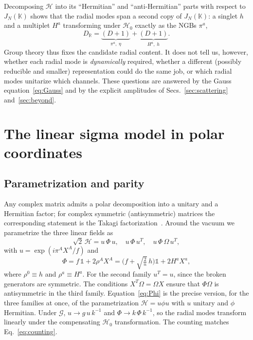 \documentclass[aps,prd,twocolumn,superscriptaddress,nofootinbib,floatfix]{revtex4-2}
\theoremstyle{remark}
\newcommand{\Hf}{\mathcal{H}}      %
\newcommand{\G}{\mathcal{G}}
\newcommand{\Hg}{\mathcal{H}_0}    %
\begin{document}
Decomposing $\Hf$ into its ``Hermitian'' and ``anti-Hermitian'' parts with respect to $J_N(\mathbb{K})$ shows that the radial modes span a second copy of $J_N(\mathbb{K})$: a singlet $h$ and a multiplet $H^a$ transforming under $\Hg$ exactly as the NGBs $\pi^a$,
\begin{equation}
D_{\mathbb R}=\underbrace{(D+1)}_{\pi^a,\;\eta}+\underbrace{(D+1)}_{H^a,\;h}.
\label{eq:counting}
\end{equation}
Group theory thus fixes the candidate radial content. It does not tell us, however, whether each radial mode is \emph{dynamically} required, whether a different (possibly reducible and smaller) representation could do the same job, or which radial modes unitarize which channels. These questions are answered by the Gauss equation~\eqref{eq:Gauss} and by the explicit amplitudes of Secs.~\ref{sec:scattering} and~\ref{sec:beyond}.

\section{The linear sigma model in polar coordinates}
\label{sec:LSM}

\subsection{Parametrization and parity}

Any complex matrix admits a polar decomposition into a unitary and a Hermitian factor; for complex symmetric (antisymmetric) matrices the corresponding statement is the Takagi factorization~\cite{Takagi:1924,HornJohnson}. Around the vacuum we parametrize the three linear fields as
\begin{equation}
\sqrt2\,\Hf=u\,\Phi\,u,\quad u\,\Phi\,u^T,\quad u\,\Phi\,\Omega\,u^T ,
\label{eq:polar}
\end{equation}
with $u=\exp(i\pi^AX^A/f)$ and
\begin{equation}
\Phi=f\,\mathbb{1}+2\rho^AX^A=\Big(f+\sqrt{\tfrac{2}{n}}\,h\Big)\mathbb{1}+2H^aX^a ,
\label{eq:Phi}
\end{equation}
where $\rho^0\equiv h$ and $\rho^a\equiv H^a$. For the second family $u^T=u$, since the broken generators are symmetric. The conditions $X^T\Omega=\Omega X$ ensure that $\Phi\Omega$ is antisymmetric in the third family. Equation~\eqref{eq:Phi} is the precise version, for the three families at once, of the parametrization $\Hf=u\phi u$ with $u$ unitary and $\phi$ Hermitian. Under $\G$, $u\to g\,u\,k^{-1}$ and $\Phi\to k\,\Phi\,k^{-1}$, so the radial modes transform linearly under the compensating $\Hg$ transformation. The counting matches Eq.~\eqref{eq:counting}.
\end{document}
